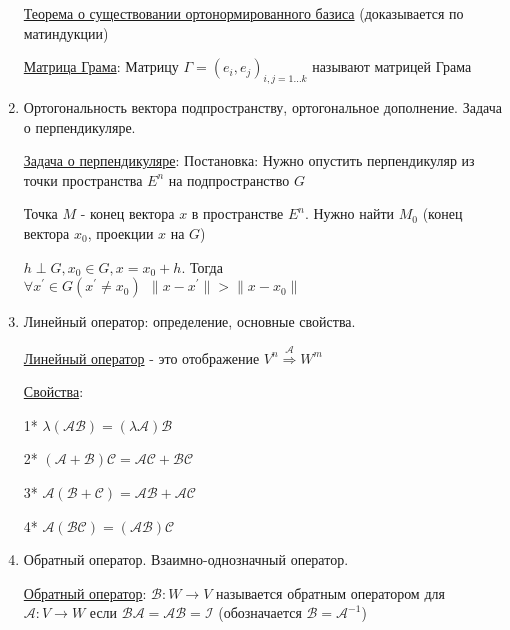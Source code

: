 \documentclass[12pt]{article}
\begin{document}
\begin{enumerate}
        \hyperlink{orthogonalbasisinspace}{Теорема о существовании ортонормированного базиса} (доказывается по матиндукции)


        \hyperlink{grammatrix}{Матрица Грама}: Матрицу $\Gamma = {(e_i, e_j)}_{i, j = 1\dots k}$ называют матрицей Грама

        \item Ортогональность вектора подпространству, ортогональное дополнение. Задача о перпендикуляре.

        \hyperlink{perpendicularproblem}{Задача о перпендикуляре}: Постановка: Нужно опустить перпендикуляр из точки пространства $E^n$ на подпространство $G$

        Точка $M$ - конец вектора $x$ в пространстве $E^n$.
        Нужно найти $M_0$ (конец вектора $x_0$, проекции $x$ на $G$)

        \begin{MyTheorem}
            \Ths $h \perp G, x_0 \in G, x = x_0 + h$. Тогда $\forall x^\prime \in G (x^\prime \neq x_0) \ \ \|x - x^\prime\| > \|x - x_0\|$
        \end{MyTheorem}

        \item Линейный оператор: определение, основные свойства.

        \hyperlink{linearoperatordefinition}{Линейный оператор} - это отображение $V^n \stackrel{\mathcal{A}}{\Longrightarrow} W^m$

        \hyperlink{linearoperatorproperties}{Свойства}:

        1* $\lambda (\mathcal{A}\mathcal{B}) = (\lambda \mathcal{A})\mathcal{B}$

        2* $(\mathcal{A} + \mathcal{B}) \mathcal{C} = \mathcal{A}\mathcal{C} + \mathcal{B}\mathcal{C}$

        3* $\mathcal{A} (\mathcal{B} + \mathcal{C}) = \mathcal{A}\mathcal{B} + \mathcal{A}\mathcal{C}$

        4* $\mathcal{A} (\mathcal{B}\mathcal{C}) = (\mathcal{A}\mathcal{B}) \mathcal{C}$


        \item Обратный оператор. Взаимно-однозначный оператор.

        \hyperlink{reverselinearoperator}{Обратный оператор}: $\mathcal{B} : W \rightarrow V$ называется обратным оператором для $\mathcal{A} : V \rightarrow W$
        если $\mathcal{B}\mathcal{A} = \mathcal{A}\mathcal{B} = \mathcal{I}$ (обозначается $\mathcal{B} = \mathcal{A}^{-1}$)


\end{enumerate}
\end{document}
